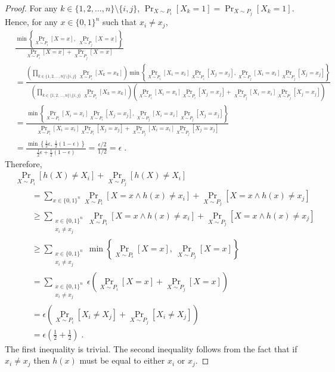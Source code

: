 \documentclass[12pt]{article}
\begin{document}
\begin{proof}
For any $k \in \{1,2,\dots,n\} \setminus \{i,j\}$, $\Pr_{X \sim P_i}[X_k = 1] = \Pr_{X \sim P_j}[X_k = 1]$.
Hence, for any $x \in \{0,1\}^n$ such that $x_i \neq x_j$,
\begin{align*}
& \frac{\displaystyle \min \left\{ \Pr_{X \sim P_i}[X = x], \ \Pr_{X \sim P_j}[X = x] \right\}}{\displaystyle \Pr_{X \sim P_i}[X = x] + \Pr_{X \sim P_j}[X = x]} \\
& =  \frac{ \displaystyle
\left( \prod_{k \in \{1,2,\dots,n\} \setminus \{i,j\}} \Pr_{X \sim P_i}[X_k = x_k] \right) \min \left\{ \Pr_{X \sim P_i}[X_i = x_i] \Pr_{X \sim P_i}[X_j = x_j], \Pr_{X \sim P_j}[X_i = x_i] \Pr_{X \sim P_j}[X_j = x_j]  \right\}
}{ \displaystyle
\left( \prod_{k \in \{1,2,\dots,n\} \setminus \{i,j\}} \Pr_{X \sim P_i}[X_k = x_k] \right) \left( \Pr_{X \sim P_i}[X_i = x_i] \Pr_{X \sim P_i}[X_j = x_j] + \Pr_{X \sim P_j}[X_i = x_i] \Pr_{X \sim P_j}[X_j = x_j]  \right)
} \\
& = \frac{ \displaystyle \min \left\{ \Pr_{X \sim P_i}[X_i = x_i] \Pr_{X \sim P_i}[X_j = x_j], \Pr_{X \sim P_j}[X_i = x_i] \Pr_{X \sim P_j}[X_j = x_j]  \right\}
}{ \displaystyle \Pr_{X \sim P_i}[X_i = x_i] \Pr_{X \sim P_i}[X_j = x_j] + \Pr_{X \sim P_j}[X_i = x_i] \Pr_{X \sim P_j}[X_j = x_j] } \\
& = \frac{ \displaystyle \min \left\{ \frac{1}{2} \epsilon, \ \frac{1}{2} (1-\epsilon) \right\}
}{ \displaystyle \frac{1}{2} \epsilon + \frac{1}{2} (1-\epsilon) } = \frac{\epsilon/2}{1/2} = \epsilon \; .
\end{align*}
Therefore,
\begin{align*}
& \Pr_{X \sim P_i}[h(X) \neq X_i] + \Pr_{X \sim P_j}[h(X) \neq X_i] \\
& \qquad = \sum_{x \in \{0,1\}^n} \Pr_{X \sim P_i}[X = x \wedge h(x) \neq x_i] + \Pr_{X \sim P_j}[X = x \wedge h(x) \neq x_j] \\
& \qquad \ge \sum_{\substack{x \in \{0,1\}^n \\ x_i \neq x_j}} \Pr_{X \sim P_i}[X = x \wedge h(x) \neq x_i] + \Pr_{X \sim P_j}[X = x \wedge h(x) \neq x_j] \\
& \qquad \ge \sum_{\substack{x \in \{0,1\}^n \\ x_i \neq x_j}} \min \left\{ \Pr_{X \sim P_i}[X = x], \ \Pr_{X \sim P_j}[X = x] \right\} \\
& \qquad = \sum_{\substack{x \in \{0,1\}^n \\ x_i \neq x_j}} \epsilon \left( \Pr_{X \sim P_i}[X = x] + \Pr_{X \sim P_j}[X = x] \right) \\
& \qquad = \epsilon \left( \Pr_{X \sim P_i}[X_i \neq X_j] + \Pr_{X \sim P_j}[X_i \neq X_j] \right) \\
& \qquad = \epsilon \left( \frac{1}{2} + \frac{1}{2} \right) \; .
\end{align*}
The first inequality is trivial. The second inequality follows from the fact that
if $x_i \neq x_j$ then $h(x)$ must be equal to either $x_i$ or $x_j$.
\end{proof}
\end{document}
